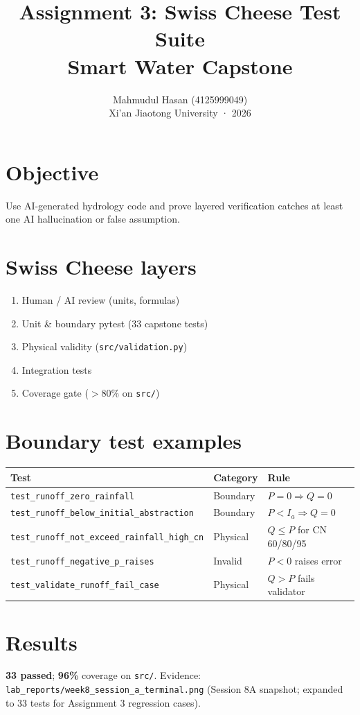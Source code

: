 \documentclass[11pt,a4paper]{article}
\title{Assignment 3: Swiss Cheese Test Suite\\Smart Water Capstone}
\author{Mahmudul Hasan (4125999049)\\Xi'an Jiaotong University · 2026}
\date{}
\begin{document}
\maketitle

\section{Objective}
Use AI-generated hydrology code and prove layered verification catches at least one AI hallucination or false assumption.

\section{Swiss Cheese layers}
\begin{enumerate}[nosep]
  \item Human / AI review (units, formulas)
  \item Unit \& boundary pytest (33 capstone tests)
  \item Physical validity (\texttt{src/validation.py})
  \item Integration tests
  \item Coverage gate ($>$80\% on \texttt{src/})
\end{enumerate}

\section{Boundary test examples}
\begin{tabular}{@{}lll@{}}
\toprule
Test & Category & Rule \\
\midrule
\texttt{test\_runoff\_zero\_rainfall} & Boundary & $P=0 \Rightarrow Q=0$ \\
\texttt{test\_runoff\_below\_initial\_abstraction} & Boundary & $P<I_a \Rightarrow Q=0$ \\
\texttt{test\_runoff\_not\_exceed\_rainfall\_high\_cn} & Physical & $Q \le P$ for CN 60/80/95 \\
\texttt{test\_runoff\_negative\_p\_raises} & Invalid & $P<0$ raises error \\
\texttt{test\_validate\_runoff\_fail\_case} & Physical & $Q>P$ fails validator \\
\bottomrule
\end{tabular}

\section{Results}
\textbf{33 passed}; \textbf{96\%} coverage on \texttt{src/}. Evidence: \texttt{lab\_reports/week8\_session\_a\_terminal.png} (Session 8A snapshot; expanded to 33 tests for Assignment 3 regression cases).
\end{document}
